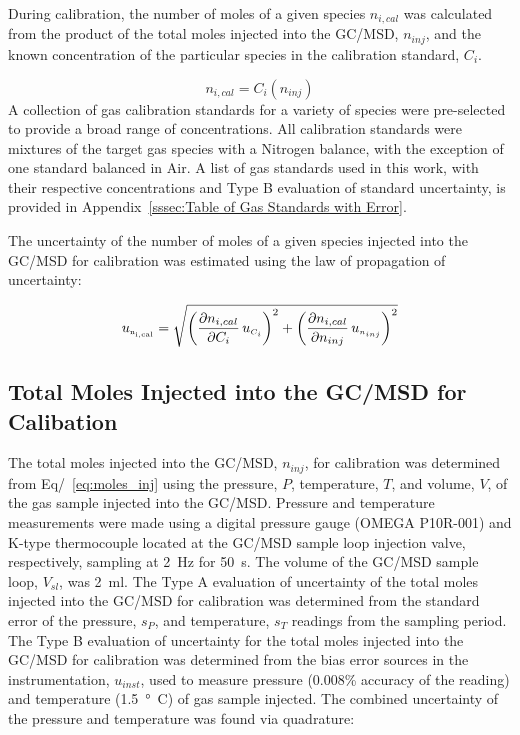 \documentclass[12pt]{article}
\begin{document}
During calibration, the number of moles of a given species $n_{i,cal}$ was calculated from the product of the total moles injected into the GC/MSD, $n_{inj}$, and the known concentration of the particular species in the calibration standard, $C_{i}$.

\begin{equation}
\label{eq:Cal_Moles}
n_{i,cal} = C_{i}(n_{inj})
\end{equation}
A collection of gas calibration standards for a variety of species were pre-selected to provide a broad range of concentrations. All calibration standards were mixtures of the target gas species with a Nitrogen balance, with the exception of one standard balanced in Air. A list of gas standards used in this work, with their respective concentrations and Type B evaluation of standard uncertainty, is provided in Appendix~\ref{sssec:Table of Gas Standards with Error}.

The uncertainty of the number of moles of a given species injected into the GC/MSD for calibration was estimated using the law of propagation of uncertainty:

\begin{equation}
\label{eq:Given_Moles_Cal_Uncertainty}
 u_{\rm \scriptscriptstyle n_{i,cal}} = \sqrt{{\left( \frac{\partial n_{i,cal}}{\partial C_{i}}\,u_{\scriptscriptstyle C_{i}} \right)}^2+{\left(\frac{\partial n_{i,cal}}{\partial n_{inj}}\,u_{\scriptscriptstyle n_{inj}}\right)}^2}
\end{equation}

\subsection{Total Moles Injected into the GC/MSD for Calibation}
\label{ssec:Total Moles Injected into the GC/MSD for Calibation}

The total moles injected into the GC/MSD, $ n_{inj}$, for calibration was determined from Eq/~\ref{eq:moles_inj} using the pressure, $P$, temperature, $T$, and volume, $V$, of the gas sample injected into the GC/MSD. Pressure and temperature measurements were made using a digital pressure gauge (OMEGA P10R-001) and K-type thermocouple located at the GC/MSD sample loop injection valve, respectively, sampling at \SI{2}{Hz} for \SI{50}{s}. The volume of the GC/MSD sample loop, $V_{sl}$, was \SI{2}{ml}. The Type A evaluation of uncertainty of the total moles injected into the GC/MSD for calibration was determined from the standard error of the pressure, $s_{P}$, and temperature, $s_{T}$ readings from the sampling period. The Type B evaluation of uncertainty for the total moles injected into the GC/MSD for calibration was determined from the bias error sources in the instrumentation, $u_{inst}$, used to measure pressure (0.008\% accuracy of the reading) and temperature (\SI{1.5}{\degree C}) of gas sample injected. The combined uncertainty of the pressure and temperature was found via quadrature:
\end{document}
